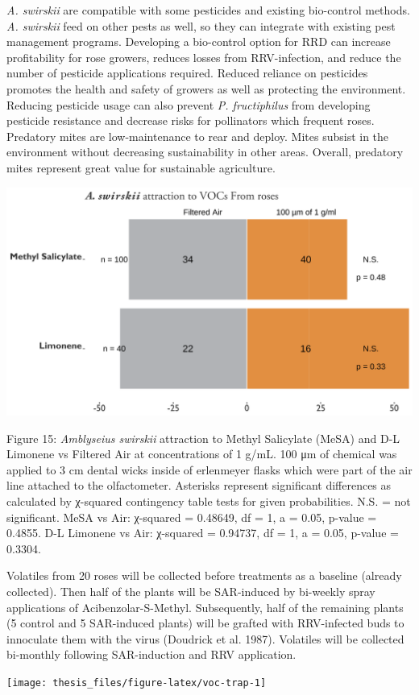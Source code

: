 \documentclass[12pt,final,CPage]{ufthesis}
\begin{document}
{  \emph{A. swirskii} are compatible with some pesticides and existing bio-control methods. \emph{A. swirskii} feed on other pests as well, so they can integrate with existing pest management programs. Developing a bio-control option for RRD can increase profitability for rose growers, reduces losses from RRV-infection, and reduce the number of pesticide applications required. Reduced reliance on pesticides promotes the health and safety of growers as well as protecting the environment. Reducing pesticide usage can also prevent \emph{P. fructiphilus} from developing pesticide resistance and decrease risks for pollinators which frequent roses. Predatory mites are low-maintenance to rear and deploy. Mites subsist in the environment without decreasing sustainability in other areas. Overall, predatory mites represent great value for sustainable agriculture.
  \begin{center}\includegraphics[width=0.8\linewidth]{figure/tests_graph} \end{center}

  Figure 15: \emph{Amblyseius swirskii} attraction to Methyl Salicylate (MeSA) and D-L Limonene vs Filtered Air at concentrations of 1 g/mL. 100 μm of chemical was applied to 3 cm dental wicks inside of erlenmeyer flasks which were part of the air line attached to the olfactometer. Asterisks represent significant differences as calculated by χ-squared contingency table tests for given probabilities. N.S. = not significant. MeSA vs Air: χ-squared = 0.48649, df = 1, a = 0.05, p-value = 0.4855. D-L Limonene vs Air: χ-squared = 0.94737, df = 1, a = 0.05, p-value = 0.3304.

  Volatiles from 20 roses will be collected before treatments as a baseline (already collected). Then half of the plants will be SAR-induced by bi-weekly spray applications of Acibenzolar-S-Methyl. Subsequently, half of the remaining plants (5 control and 5 SAR-induced plants) will be grafted with RRV-infected buds to innoculate them with the virus (Doudrick et al. 1987). Volatiles will be collected bi-monthly following SAR-induction and RRV application.
  \begin{center}\texttt{[image: thesis\_files/figure-latex/voc-trap-1]} \end{center}

}
\end{document}
